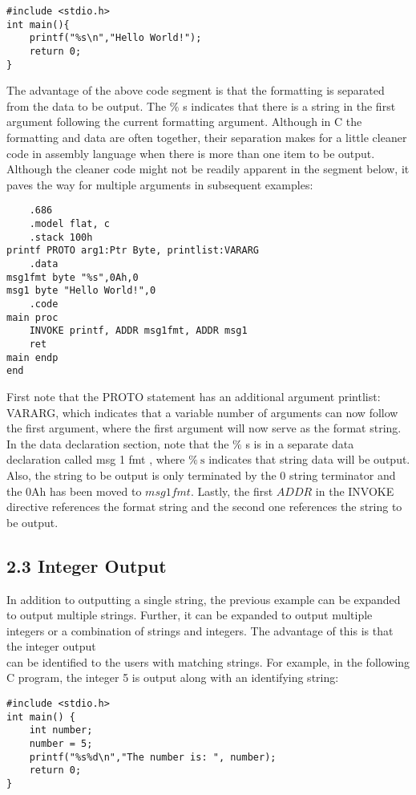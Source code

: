 \documentclass[10pt]{article}
\begin{document}
\begin{verbatim}
#include <stdio.h>
int main(){
    printf("%s\n","Hello World!");
    return 0;
}
\end{verbatim}

The advantage of the above code segment is that the formatting is separated from the data to be output. The $\%$ s indicates that there is a string in the first argument following the current formatting argument. Although in C the formatting and data are often together, their separation makes for a little cleaner code in assembly language when there is more than one item to be output. Although the cleaner code might not be readily apparent in the segment below, it paves the way for multiple arguments in subsequent examples:

\begin{verbatim}
    .686
    .model flat, c
    .stack 100h
printf PROTO arg1:Ptr Byte, printlist:VARARG
    .data
msg1fmt byte "%s",0Ah,0
msg1 byte "Hello World!",0
    .code
main proc
    INVOKE printf, ADDR msg1fmt, ADDR msg1
    ret
main endp
end
\end{verbatim}

First note that the PROTO statement has an additional argument printlist: VARARG, which indicates that a variable number of arguments can now follow the first argument, where the first argument will now serve as the format string. In the data declaration section, note that the $\%$ s is in a separate data declaration called msg 1 fmt , where $\% \mathrm{~s}$ indicates that string data will be output. Also, the string to be output is only terminated by the 0 string terminator and the 0Ah has been moved to $m s g 1 f m t$. Lastly, the first $A D D R$ in the INVOKE directive references the format string and the second one references the string to be output.

\subsection*{2.3 Integer Output}
In addition to outputting a single string, the previous example can be expanded to output multiple strings. Further, it can be expanded to output multiple integers or a combination of strings and integers. The advantage of this is that the integer output\\
can be identified to the users with matching strings. For example, in the following C program, the integer 5 is output along with an identifying string:

\begin{verbatim}
#include <stdio.h>
int main() {
    int number;
    number = 5;
    printf("%s%d\n","The number is: ", number);
    return 0;
}
\end{verbatim}
\end{document}
